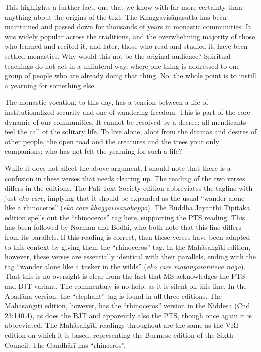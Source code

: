 \documentclass[12pt,openany]{book}%
\begin{document}
This highlights a further fact, one that we know with far more certainty than anything about the origins of the text. The \textsanskrit{Khaggavisāṇasutta} has been maintained and passed down for thousands of years in monastic communities. It was widely popular across the traditions, and the overwhelming majority of those who learned and recited it, and later, those who read and studied it, have been settled monastics. Why would this not be the original audience? Spiritual teachings do not act in a unilateral way, where one thing is addressed to one group of people who are already doing that thing. No: the whole point is to instill a yearning for something else.

The monastic vocation, to this day, has a tension between a life of institutionalized security and one of wandering freedom. This is part of the core dynamic of our communities. It cannot be resolved by a decree; all mendicants feel the call of the solitary life. To live alone, aloof from the dramas and desires of other people, the open road and the creatures and the trees your only companions; who has not felt the yearning for such a life?

While it does not affect the above argument, I should note that there is a confusion in these verses that needs clearing up. The reading of the two verses differs in the editions. The Pali Text Society edition abbreviates the tagline with just \textit{eko care}, implying that it should be expanded as the usual “wander alone like a rhinoceros” (\textit{eko care \textsanskrit{khaggavisāṇakappo}}). The Buddha Jayanthi Tipitaka edition spells out the “rhinoceros” tag here, supporting the PTS reading. This has been followed by Norman and Bodhi, who both note that this line differs from its parallels. If this reading is correct, then these verses have been adapted to this context by giving them the “rhinoceros” tag. In the \textsanskrit{Mahāsaṅgīti} edition, however, these verses are essentially identical with their parallels, ending with the tag “wander alone like a tusker in the wilds” (\textit{eko care \textsanskrit{mātaṅgaraññeva} \textsanskrit{nāgo}}). That this is no oversight is clear from the fact that MS acknowledges the PTS and BJT variant. The commentary is no help, as it is silent on this line. In the \textsanskrit{Apadāna} version, the “elephant” tag is found in all three editions. The \textsanskrit{Mahāsaṅgīti} edition, however, has the “rhinoceros” version in the Niddesa (Cnd 23:140.4), as does the BJT and apparently also the PTS, though once again it is abbreviated. The \textsanskrit{Mahāsaṅgīti} readings throughout are the same as the VRI edition on which it is based, representing the Burmese edition of the Sixth Council. The \textsanskrit{Gandhārī} has “rhinceros”.
\end{document}
